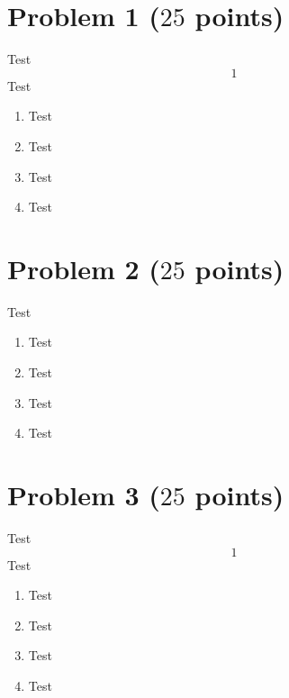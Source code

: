 \documentclass[a4paper]{article}%
\begin{document}
\section*{Problem 1 ($25$ points)} 
Test
\begin{equation*}
  1
\end{equation*}
Test

\begin{enumerate}[label=(\alph*)]
  \item 
  Test
  \item
  Test
  \item 
  Test
  \item 
  Test
\end{enumerate}

\clearpage %

\clearpage %

\clearpage
{}\clearpage %



\section*{Problem 2 ($25$ points)} 
Test

\begin{enumerate}[label=(\alph*)]
  \item 
  Test
  \item
  Test
  \item 
  Test
  \item 
  Test
\end{enumerate}

\clearpage %

\clearpage %

\clearpage
{}\clearpage %







\section*{Problem 3 ($25$ points)} 
Test
\begin{equation*}
  1
\end{equation*}
Test

\begin{enumerate}[label=(\alph*)]
  \item 
  Test
  \item
  Test
  \item 
  Test
  \item 
  Test
\end{enumerate}
\end{document}

